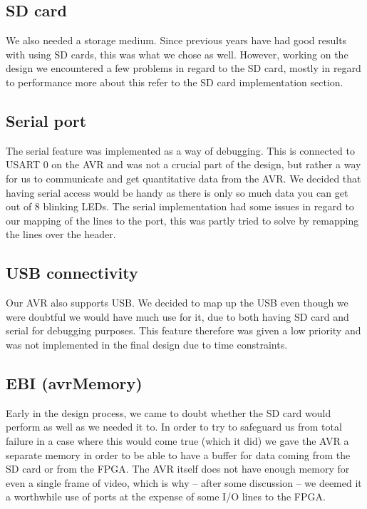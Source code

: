 \subsection{SD card} %

We also needed a storage medium. Since previous years have had good results with
using \ac{SD} cards, this was what we chose as well. However, working on the
design we encountered a few problems in regard to the \ac{SD} card, mostly in
regard to performance more about this refer to the \ac{SD} card implementation
section. 

\subsection{Serial port}

The serial feature was implemented as a way of debugging. This is connected to
\ac{USART} 0 on the AVR and was not a crucial part of the design, but rather a way for us to communicate and get quantitative data from the AVR. We decided that having serial access would be handy as there is only so much data you can get out of 8 blinking LEDs. The serial implementation had some issues in regard to our mapping of the lines to the port, this was partly tried to solve by remapping the lines over the header.

\subsection{USB connectivity}

Our AVR also supports \ac{USB}. We decided to map up the \ac{USB} even though we were doubtful we would have much use for it, due to both having \ac{SD} card and serial for debugging purposes. This feature therefore was given a low priority and was not implemented in the final design due to time constraints.
 
\subsection{EBI (avrMemory)}

Early in the design process, we came to doubt whether the \ac{SD} card would perform as well as we needed it to. In order to try to safeguard us from total failure in a case where this would come true (which it did) we gave the AVR a separate memory in order to be able to have a buffer for data coming from the \ac{SD} card or from the \ac{FPGA}. The AVR itself does not have enough memory for even a single frame of video, which is why -- after some discussion -- we deemed it a worthwhile use of ports at the expense of some \ac{I/O} lines to the FPGA.

